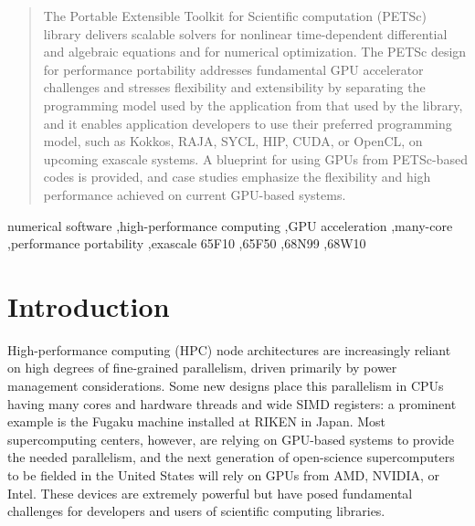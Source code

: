 \documentclass[5p,times]{elsarticle}
\begin{document}
\begin{frontmatter}
\begin{abstract}
The Portable Extensible Toolkit for Scientific computation (PETSc)
library delivers scalable solvers for
nonlinear time-dependent differential and algebraic equations and for numerical optimization.
The PETSc design for performance portability addresses fundamental GPU accelerator challenges and stresses
flexibility and extensibility by separating the
programming model
used by the application from that used by the library,
and it enables application
developers to use their preferred programming model, such as
Kokkos, RAJA, SYCL, HIP, CUDA, or OpenCL,
on upcoming exascale systems.
A blueprint for using GPUs from PETSc-based codes is provided, and 
case studies emphasize the 
flexibility and high performance achieved 
on current GPU-based systems.
\end{abstract}

\begin{keyword}
numerical software \sep high-performance computing \sep GPU acceleration \sep many-core \sep performance portability \sep exascale %
\MSC[2010] 65F10 \sep 65F50 \sep 68N99 \sep 68W10
\end{keyword}

\end{frontmatter}

\linenumbers

\section{Introduction}

High-performance computing (HPC) node architectures are increasingly reliant on
high degrees of fine-grained parallelism, 
driven primarily by power management considerations.
Some new designs place this parallelism in CPUs having many 
cores and hardware threads and wide SIMD registers:
a prominent example is the Fugaku machine installed at RIKEN in Japan.
Most supercomputing centers, however, are relying on GPU-based systems to provide the
needed parallelism, and the next generation of open-science supercomputers to be fielded in
the United States will rely on GPUs from AMD, NVIDIA, or Intel.
These devices are extremely powerful but have posed fundamental challenges for developers and
users of scientific computing libraries.
\end{document}
